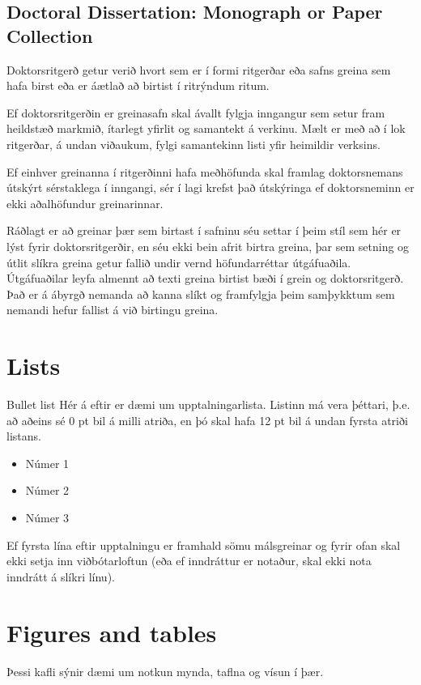 \documentclass[a4paper,12pt,twoside,BCOR=10mm]{scrbook}
\begin{document}
\section{Doctoral Dissertation: Monograph or Paper Collection}
Doktorsritgerð getur verið hvort sem er í formi ritgerðar eða safns greina sem hafa birst eða  er áætlað að birtist í ritrýndum ritum. 

Ef doktorsritgerðin er greinasafn skal ávallt fylgja inngangur sem setur fram heildstæð markmið, ítarlegt yfirlit og samantekt á verkinu. Mælt er með að í lok ritgerðar, á undan viðaukum, fylgi samantekinn listi yfir heimildir verksins.

Ef einhver greinanna í ritgerðinni hafa meðhöfunda skal framlag doktorsnemans útskýrt sérstaklega í inngangi, sér í lagi krefst það útskýringa ef doktorsneminn er ekki aðalhöfundur greinarinnar. 

Ráðlagt er að greinar þær sem birtast í safninu séu settar í þeim stíl sem hér er lýst fyrir doktorsritgerðir, en séu ekki bein afrit birtra greina, þar sem setning og útlit slíkra greina getur fallið undir vernd höfundarréttar útgáfuaðila. Útgáfuaðilar leyfa almennt að texti greina birtist bæði í grein og doktorsritgerð. Það er á ábyrgð nemanda að kanna slíkt og framfylgja þeim samþykktum sem nemandi hefur fallist á við birtingu greina.
 
\chapter{Lists}
Bullet list
Hér á eftir er dæmi um upptalningarlista. Listinn má vera þéttari, þ.e. að aðeins sé 0 pt bil á milli atriða, en þó skal hafa 12 pt bil á undan fyrsta atriði listans.
\begin{itemize}
 \item Númer 1
 \item Númer 2
 \item Númer 3
\end{itemize}
Ef fyrsta lína eftir upptalningu er framhald sömu málsgreinar og fyrir ofan skal ekki setja inn viðbótarloftun (eða ef inndráttur er notaður, skal ekki nota inndrátt á slíkri línu). 

\chapter{Figures and tables}
Þessi kafli sýnir dæmi um notkun mynda, taflna og vísun í þær.
\end{document}

